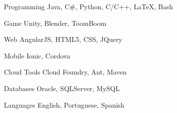 

\begin{cvskills}

  \cvskill
    {Programming} %
    {Java, C\#, Python, C/C++, LaTeX, Bash} %

  \cvskill
    {Game} %
    {Unity, Blender, ToomBoom} %

  \cvskill
    {Web} %
    {AngularJS, HTML5, CSS, JQuery} %

  \cvskill
    {Mobile} %
    {Ionic, Cordova} %
    
  \cvskill
    {Cloud Tools} %
    {Cloud Foundry, Ant, Maven} %

  \cvskill
    {Databases} %
    {Oracle, SQLServer, MySQL} %
        
  \cvskill
    {Languages} %
    {English, Portuguese, Spanish} %
    

\end{cvskills}
